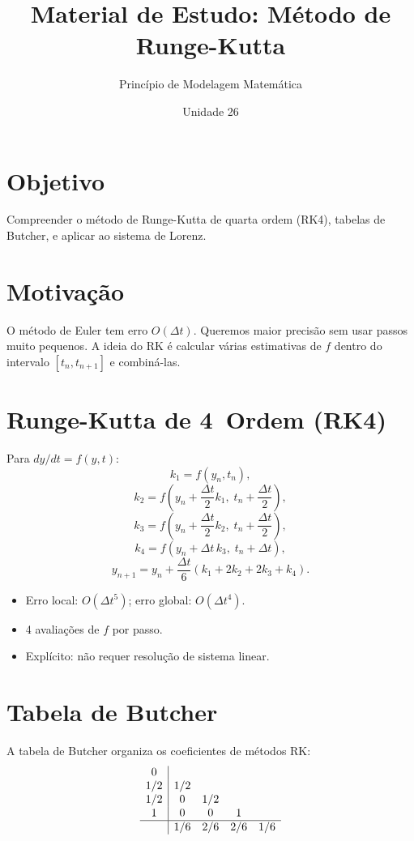 \documentclass[12pt,a4paper]{article}
\title{Material de Estudo: M\'etodo de Runge-Kutta}
\author{Princ\'ipio de Modelagem Matem\'atica}
\date{Unidade 26}
\begin{document}
\maketitle

\section*{Objetivo}
Compreender o m\'etodo de Runge-Kutta de quarta ordem (RK4), tabelas de Butcher, e aplicar ao sistema de Lorenz.

\section*{Motiva\c{c}\~ao}

O m\'etodo de Euler tem erro $O(\Delta t)$. Queremos maior precis\~ao sem usar passos muito pequenos. A ideia do RK \'e calcular v\'arias estimativas de $f$ dentro do intervalo $[t_n, t_{n+1}]$ e combin\'a-las.

\section*{Runge-Kutta de 4\textordfeminine\ Ordem (RK4)}

Para $dy/dt = f(y, t)$:
\[
k_1 = f(y_n, t_n),
\]
\[
k_2 = f\!\left(y_n + \frac{\Delta t}{2}k_1,\; t_n + \frac{\Delta t}{2}\right),
\]
\[
k_3 = f\!\left(y_n + \frac{\Delta t}{2}k_2,\; t_n + \frac{\Delta t}{2}\right),
\]
\[
k_4 = f(y_n + \Delta t\,k_3,\; t_n + \Delta t),
\]
\[
y_{n+1} = y_n + \frac{\Delta t}{6}(k_1 + 2k_2 + 2k_3 + k_4).
\]
\begin{itemize}
  \item Erro local: $O(\Delta t^5)$; erro global: $O(\Delta t^4)$.
  \item 4 avalia\c{c}\~oes de $f$ por passo.
  \item Expl\'icito: n\~ao requer resolu\c{c}\~ao de sistema linear.
\end{itemize}

\section*{Tabela de Butcher}

A tabela de Butcher organiza os coeficientes de m\'etodos RK:
\[
\begin{array}{c|cccc}
0 & & & & \\
1/2 & 1/2 & & & \\
1/2 & 0 & 1/2 & & \\
1 & 0 & 0 & 1 & \\
\hline
& 1/6 & 2/6 & 2/6 & 1/6
\end{array}
\]
\end{document}
